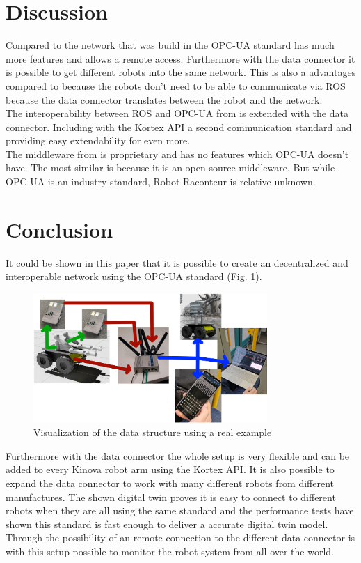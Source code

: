 \documentclass[conference]{IEEEtran}
\begin{document}
\section{Discussion}
Compared to the network that was build in \cite{SotaCAN} the OPC-UA standard has much more features and allows a remote access.
Furthermore with the data connector it is possible to get different robots into the same network.
This is also a advantages compared to \cite{SotaROS} because the robots don't need to be able to communicate via ROS because the data connector translates between the robot and the network.\\
The interoperability between ROS and OPC-UA from \cite{StoaROStoOPCUA} is extended with the data connector.
Including with the Kortex API a second communication standard and providing easy extendability for even more.\\
The middleware from \cite{SotaFusion} is proprietary and has no features which OPC-UA doesn't have.
The most similar is \cite{SotaRaconteur} because it is an open source middleware.
But while OPC-UA is an industry standard, Robot Raconteur is relative unknown.
\section{Conclusion}
It could be shown in this paper that it is possible to create an decentralized and interoperable network using the OPC-UA standard (Fig. \ref{fig:AufbauBilder}).\\

\begin{figure}[htbp]
    \centerline{\includegraphics[width=8.9cm]{Pictures/AufbauBilder.png}}
    \caption{Visualization of the data structure using a real example}
    \label{fig:AufbauBilder}
\end{figure}
Furthermore with the data connector the whole setup is very flexible and can be added to every Kinova robot arm using the Kortex API.
It is also possible to expand the data connector to work with many different robots from different manufactures.
The shown digital twin proves it is easy to connect to different robots when they are all using the same standard and the performance tests have shown this standard is fast enough to deliver a accurate digital twin model.
Through the possibility of an remote connection to the different data connector is with this setup possible to monitor the robot system from all over the world.
\end{document}

